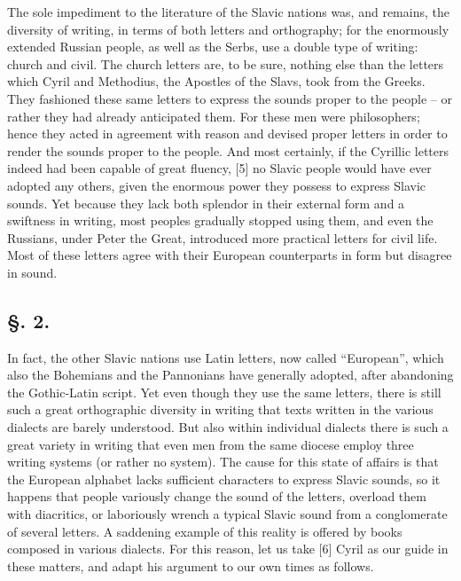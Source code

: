 The sole impediment to the literature of the Slavic nations was, and remains, the diversity of writing, in terms of both letters and orthography; for the enormously extended Russian people, as well as the Serbs, use a double type of writing: church and civil. The church letters are, to be sure, nothing else than the letters which Cyril and Methodius, the Apostles of the Slavs, took from the Greeks. They fashioned these same letters to express the sounds proper to the people -- or rather they had already anticipated them. For these men were philosophers; hence they acted in agreement with reason and devised proper letters in order to render the sounds proper to the people. And most certainly, if the Cyrillic letters indeed had been capable of great fluency, [5] no Slavic people would have ever adopted any others, given the enormous power they possess to express Slavic sounds. Yet because they lack both splendor in their external form and a swiftness in writing, most peoples gradually stopped using them, and even the Russians, under Peter the Great, introduced more practical letters for civil life. Most of these letters agree with their European counterparts in form but disagree in sound.

\subsection*{\hspace*{\fill}§. 2.\hspace*{\fill}}

In fact, the other Slavic nations use Latin letters, now called “European”, which also the Bohemians and the Pannonians have generally adopted, after abandoning the Gothic-Latin script. Yet even though they use the same letters, there is still such a great orthographic diversity in writing that texts written in the various dialects are barely understood. But also within individual dialects there is such a great variety in writing that even men from the same diocese employ three writing systems (or rather no system). The cause for this state of affairs is that the European alphabet lacks sufficient characters to express Slavic sounds, so it happens that people variously change the sound of the letters, overload them with diacritics, or laboriously wrench a typical Slavic sound from a conglomerate of several letters. A saddening example of this reality is offered by books composed in various dialects. For this reason, let us take [6] Cyril as our guide in these matters, and adapt his argument to our own times as follows.

